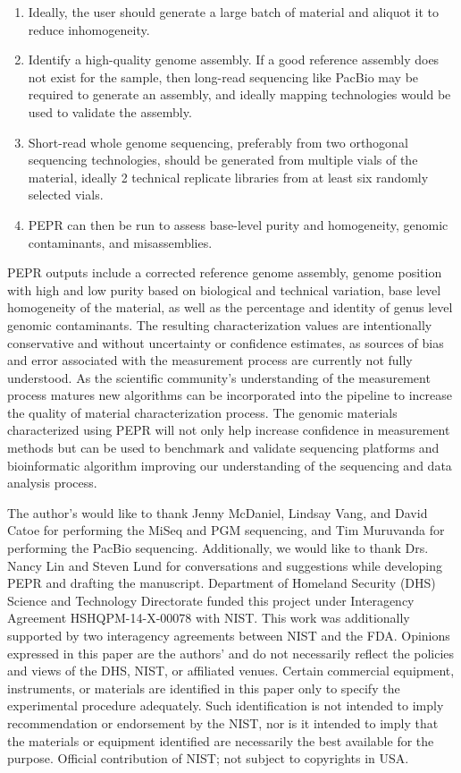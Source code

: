 \documentclass[smallextended]{svjour3}\usepackage[]{graphicx}\usepackage[]{color}
\begin{document}
\begin{enumerate}
    \item Ideally, the user should generate a large batch of material and aliquot it to reduce inhomogeneity.
    \item Identify a high-quality genome assembly. If a good reference assembly does not exist for the sample, then long-read sequencing like PacBio may be required to generate an assembly, and ideally mapping technologies would be used to validate the assembly.
    \item Short-read whole genome sequencing, preferably from two orthogonal sequencing technologies, should be generated from multiple vials of the material, ideally 2 technical replicate libraries from at least six randomly selected vials.
    \item PEPR can then be run to assess base-level purity and homogeneity, genomic contaminants, and misassemblies.
\end{enumerate}

PEPR outputs include a corrected reference genome assembly, genome position with high and low purity based on biological and technical variation, base level homogeneity of the material, as well as the percentage and identity of genus level genomic contaminants. 
The resulting characterization values are intentionally conservative and without uncertainty or confidence estimates, as sources of bias and error associated with the measurement process are currently not fully understood. 
As the scientific community's understanding of the measurement process matures new algorithms can be incorporated into the pipeline to increase the quality of material characterization process. 
The genomic materials characterized using PEPR will not only help increase confidence in measurement methods but can be used to benchmark and validate sequencing platforms and bioinformatic algorithm improving our understanding of the sequencing and data analysis process.


\begin{acknowledgements}
The author’s would like to thank Jenny McDaniel, Lindsay Vang, and David Catoe for performing the MiSeq and PGM sequencing, and Tim Muruvanda for performing the PacBio sequencing. 
Additionally, we would like to thank Drs. Nancy Lin and Steven Lund for conversations and suggestions while developing PEPR and drafting the manuscript. 
Department of Homeland Security (DHS) Science and Technology Directorate funded this project under Interagency Agreement HSHQPM-14-X-00078 with NIST. 
This work was additionally supported by two interagency agreements between NIST and the FDA. 
Opinions expressed in this paper are the authors’ and do not necessarily reflect the policies and views of the DHS, NIST, or affiliated venues. 
Certain commercial equipment, instruments, or materials are identified in this paper only to specify the experimental procedure adequately. 
Such identification is not intended to imply recommendation or endorsement by the NIST, nor is it intended to imply that the materials or equipment identified are necessarily the best available for the purpose.
Official contribution of NIST; not subject to copyrights in USA.
\end{acknowledgements}



\end{document}
